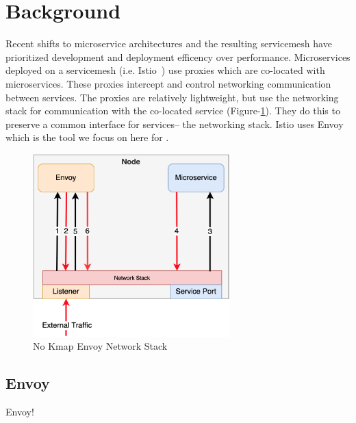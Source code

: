 \section{Background}
\label{sec:background}
Recent shifts to microservice architectures and the resulting servicemesh have prioritized development and deployment efficency over performance.
Microservices deployed on a servicemesh (i.e. Istio~\cite{istio}) use proxies which are co-located with microservices.
These proxies intercept and control networking communication between services.
The proxies are relatively lightweight, but use the networking stack for communication with the co-located service (Figure-\ref{fig:no_kmap}).
They do this to preserve a common interface for services-- the networking stack.
Istio uses Envoy~\cite{envoy} which is the tool we focus on here for \sysname.

\begin{figure}[!htb]
    \begin{minipage}{0.5\textwidth}
        \centering
        \includegraphics[keepaspectratio=true,width=3in]{figures/design/no_kmap.png}
        \caption{No Kmap Envoy Network Stack}
        \label{fig:no_kmap}
    \end{minipage}%
\end{figure}

\subsection{Envoy}
Envoy!
